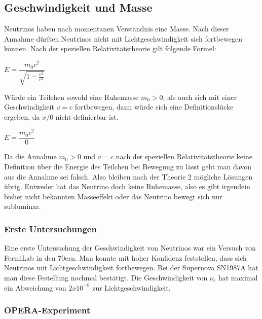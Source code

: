\subsection{Geschwindigkeit und Masse}

Neutrinos haben nach momentanen Verständnis eine Masse. Nach dieser Annahme dürften Neutrinos nicht mit Lichtgeschwindigkeit
sich fortbewegen können. Nach der speziellen Relativitätstheorie gilt folgende Formel:
\begin{center}
    $E={\dfrac {m_0c^{2}}{\sqrt {1-{\frac {v^{2}}{c^{2}}}}}}$ \cite{Stoecker2000}
\end{center}
Würde ein Teilchen sowohl eine Ruhemasse $m_0 > 0$, als auch sich mit einer Geschwindigkeit $v=c$ fortbewegen,
dann würde sich eine Definitionslücke ergeben, da $x/0$ nicht definierbar ist.
\begin{center}
    $E={\dfrac {m_0c^{2}}{0}} $
\end{center}
Da die Annahme $m_0 > 0$ und $v=c$ nach der speziellen Relativitätstheorie keine Definition über die Energie des Teilchen
bei Bewegung zu lässt geht man davon aus die Annahme sei falsch.
Also bleiben nach der Theorie 2 mögliche Lösungen übrig. Entweder hat das Neutrino doch keine Ruhemasse, also es gibt
irgendein bisher nicht bekannten Masseeffekt oder das Neutrino bewegt sich nur subluminar.

\subsubsection{Erste Untersuchungen}

Eine erste Untersuchung der Geschwindigkeit von Neutrinos war ein Versuch von FermiLab in den 70ern.
Man konnte mit hoher Konfidenz feststellen, dass sich Neutrinos mit Lichtgeschwindigkeit fortbewegen.
Bei der Supernova SN1987A hat man diese Festellung nochmal bestätigt. Die Geschwindigkeit von $\overline{\nu}_e$
hat maximal ein Abweichung von $2x10^{-9}$ zur Lichtgeschwindigkeit. \cite{Longo1987}

\subsubsection{OPERA-Experiment}

